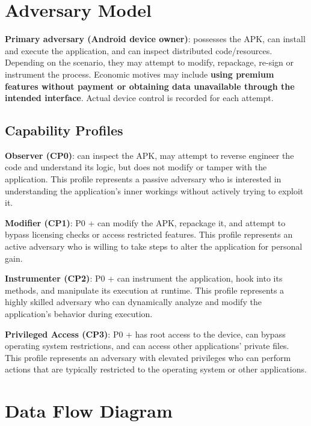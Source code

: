 \documentclass{article}
\begin{document}
\section{Adversary Model}

\textbf{Primary adversary (Android device owner)}: possesses the APK, can install and execute the application, and can inspect distributed code/resources. Depending on the scenario, they may attempt to modify, repackage, re-sign or instrument the process. Economic motives may include \textbf{using premium features without payment or obtaining data unavailable through the intended interface}. Actual device control is recorded for each attempt.


\subsection{Capability Profiles}

\textbf{Observer (CP0)}: can inspect the APK, may attempt to reverse engineer the code and understand its logic, but does not modify or tamper with the application. This profile represents a passive adversary who is interested in understanding the application's inner workings without actively trying to exploit it.

\medskip

\noindent\textbf{Modifier (CP1)}: P0 + can modify the APK, repackage it, and attempt to bypass licensing checks or access restricted features. This profile represents an active adversary who is willing to take steps to alter the application for personal gain.

\medskip

\noindent\textbf{Instrumenter (CP2)}: P0 + can instrument the application, hook into its methods, and manipulate its execution at runtime. This profile represents a highly skilled adversary who can dynamically analyze and modify the application's behavior during execution.

\medskip

\noindent\textbf{Privileged Access (CP3)}: P0 + has root access to the device, can bypass operating system restrictions, and can access other applications' private files. This profile represents an adversary with elevated privileges who can perform actions that are typically restricted to the operating system or other applications.

\section{Data Flow Diagram}
\end{document}
